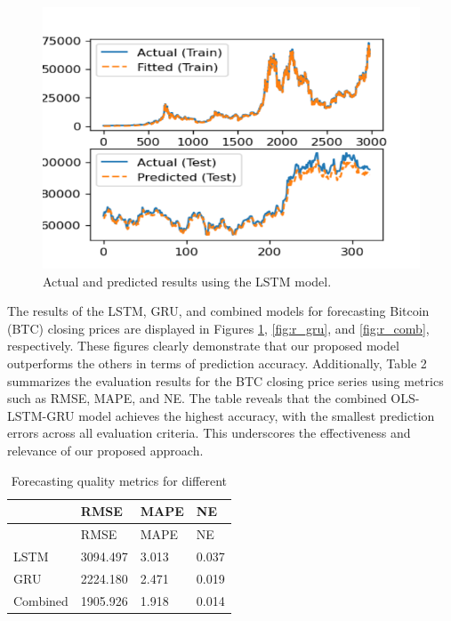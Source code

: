 \documentclass[]{interact}
\theoremstyle{plain}%
\theoremstyle{definition}
\theoremstyle{remark}
\begin{document}
\begin{figure}[H]

{\centering \includegraphics[width=0.9\linewidth]{LSTM1} 

}

\caption{Actual and predicted results using the LSTM model.}\label{fig:r_lstm}
\end{figure}

The results of the LSTM, GRU, and combined models for forecasting
Bitcoin (BTC) closing prices are displayed in Figures \ref{fig:r_lstm},
\ref{fig:r_gru}, and \ref{fig:r_comb}, respectively. These figures
clearly demonstrate that our proposed model outperforms the others in
terms of prediction accuracy. Additionally, Table 2 summarizes the
evaluation results for the BTC closing price series using metrics such
as RMSE, MAPE, and NE. The table reveals that the combined OLS-LSTM-GRU
model achieves the highest accuracy, with the smallest prediction errors
across all evaluation criteria. This underscores the effectiveness and
relevance of our proposed approach.

\begin{longtable}[]{@{}llll@{}}
\caption{Forecasting quality metrics for different}\tabularnewline
\toprule\noalign{}
& RMSE & MAPE & NE \\
\midrule\noalign{}
\endfirsthead
\toprule\noalign{}
& RMSE & MAPE & NE \\
\midrule\noalign{}
\endhead
\bottomrule\noalign{}
\endlastfoot
LSTM & 3094.497 & 3.013 & 0.037 \\
GRU & 2224.180 & 2.471 & 0.019 \\
Combined & 1905.926 & 1.918 & 0.014 \\
\end{longtable}
\end{document}
